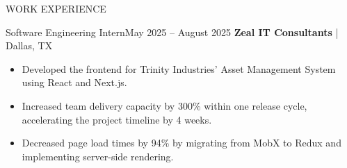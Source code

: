 \documentclass[]{mcdowellcv}
\begin{document}
\begin{cvsection}{WORK EXPERIENCE}
	\begin{cvsubsection}{Software Engineering Intern}{}{May 2025 -- August 2025}
		\textbf{Zeal IT Consultants} | Dallas, TX
		\begin{itemize}
			\item Developed the frontend for Trinity Industries' Asset Management System using React and Next.js.
			\item Increased team delivery capacity by 300\% within one release cycle, accelerating the project timeline by 4 weeks.
			\item Decreased page load times by 94\% by migrating from MobX to Redux and implementing server-side rendering.
		\end{itemize}
	\end{cvsubsection}
\end{cvsection}
\end{document}
